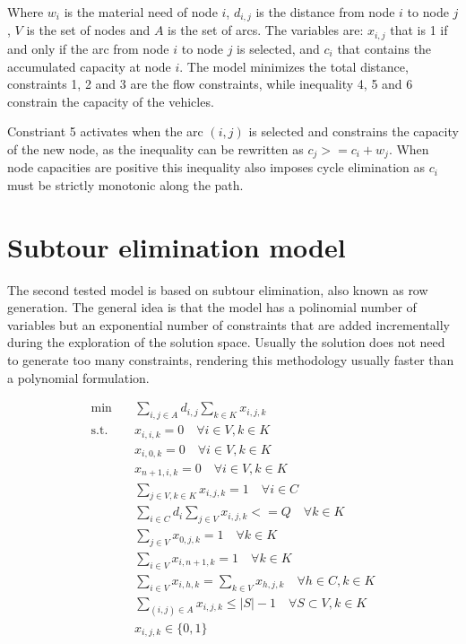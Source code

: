 Where $w_i$ is the material need of node $i$, $d_{i,j}$ is the distance from node $i$ to node $j$, $V$ is the set of nodes and $A$ is the set of arcs. The variables are: $x_{i, j}$ that is 1 if and only if the arc from node $i$ to node $j$ is selected, and $c_i$ that contains the accumulated capacity at node $i$.
The model minimizes the total distance, constraints 1, 2 and 3 are the flow constraints, while inequality 4, 5 and 6 constrain the capacity of the vehicles.

Constriant 5 activates when the arc $(i, j)$ is selected and constrains the capacity of the new node, as the inequality can be rewritten as $c_j >= c_i + w_j$. When node capacities are positive this inequality also imposes cycle elimination as $c_i$ must be strictly monotonic along the path.

\section{Subtour elimination model}
\label{subtour-elimination-model}
The second tested model is based on subtour elimination, also known as row generation. The general idea is that the model has a polinomial number of variables but an exponential number of constraints that are added incrementally during the exploration of the solution space. Usually the solution does not need to generate too many constraints, rendering this methodology usually faster than a polynomial formulation.

\begin{align*}
    \min \quad & \sum_{i,j \in A}{d_{i,j}\sum_{k \in K}{x_{i,j,k}}}\\
    \textrm{s.t.} \quad
      &x_{i,i,k} = 0 \quad \forall i \in V, k \in K \tag{1}\\
      &x_{i, 0, k} = 0 \quad \forall i \in V, k \in K \tag{2}\\
      &x_{n+1, i, k} = 0 \quad \forall i \in V, k \in K \tag{3}\\
      &\sum_{j \in V,k \in K} {x_{i,j,k}} = 1 \quad \forall i \in C \tag{4}\\
      &\sum_{i \in C} {d_i\sum_{j \in V}{x_{i,j,k}}} <= Q \quad \forall k \in K \tag{5}\\
      &\sum_{j \in V} {x_{0,j,k}} = 1 \quad \forall k \in K \tag{6}\\
      &\sum_{i \in V} {x_{i,n+1,k}} = 1 \quad \forall k \in K \tag{7}\\
      &\sum_{i \in V} {x_{i,h,k}} = \sum_{k \in V} {x_{h,j,k}} \quad \forall h \in C, k \in K \tag{8}\\
      &\sum_{(i, j) \in A} {x_{i,j,k}} \leq |S| - 1 \quad \forall S \subset V, k \in K \tag{9} \\
      &x_{i,j,k} \in \{0,1\} \\
\end{align*}

